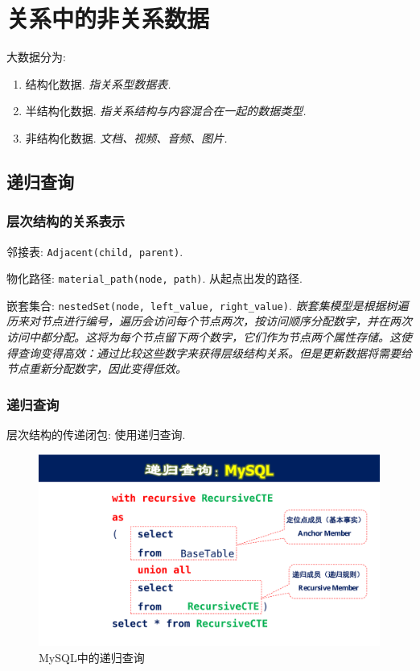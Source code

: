 \chapter{关系中的非关系数据}

大数据分为:
\begin{enumerate}
    \item 结构化数据. \textit{指关系型数据表.}
    \item 半结构化数据. \textit{指关系结构与内容混合在一起的数据类型.}
    \item 非结构化数据. \textit{文档、视频、音频、图片.}
\end{enumerate}

\section{递归查询}

\subsection{层次结构的关系表示}

邻接表: \verb|Adjacent(child, parent)|.

物化路径: \verb|material_path(node, path)|. 从起点出发的路径.

嵌套集合: \verb|nestedSet(node, left_value, right_value)|. \textit{嵌套集模型是根据树遍历来对节点进行编号，遍历会访问每个节点两次，按访问顺序分配数字，并在两次访问中都分配。这将为每个节点留下两个数字，它们作为节点两个属性存储。这使得查询变得高效：通过比较这些数字来获得层级结构关系。但是更新数据将需要给节点重新分配数字，因此变得低效。}

\subsection{递归查询}

层次结构的传递闭包: 使用递归查询.

\begin{figure}[H]
    \centering
    \includegraphics[width=.4\textwidth]{./image/递归查询.pdf}
    \caption{MySQL中的递归查询}
\end{figure}

